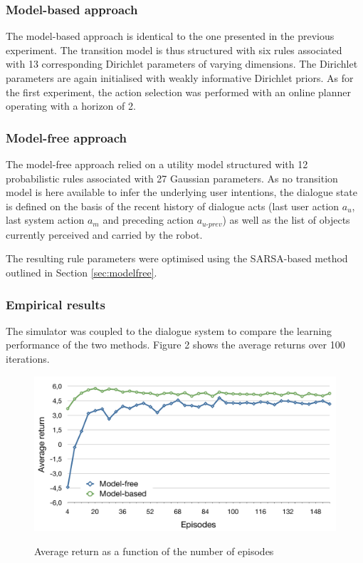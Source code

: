 \subsubsection*{Model-based approach}

The model-based approach is identical to the one presented in the previous experiment. The transition model is thus structured with six rules associated with 13 corresponding Dirichlet parameters of varying dimensions.   The Dirichlet parameters are again initialised with weakly informative Dirichlet priors.  As for the first experiment, the action selection was performed with an online planner operating with a horizon of 2. 

\subsubsection*{Model-free approach}

The model-free approach relied on a utility model structured with 12 probabilistic rules associated with 27 Gaussian parameters. As no transition model is here available to infer the underlying user intentions, the dialogue state is defined on the basis of the recent history of dialogue acts (last user action $a_u$, last system action $a_m$ and preceding action $a_{u\mbox{-}prev}$) as well as the list of objects currently perceived and carried by the robot.

The resulting rule parameters were optimised using the SARSA-based method outlined in Section \ref{sec:modelfree}. 

\subsubsection*{Empirical results}

The simulator was coupled to the dialogue system to compare the learning performance of the two methods.  Figure 2 shows the average returns over 100 iterations.

\begin{figure}[h]
\centering
\includegraphics[scale=0.40]{imgs/episodes.pdf}
\label{fig:return_episodes}
\caption{Average return as a function of the number of episodes}
\end{figure}

